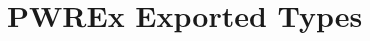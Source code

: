 \hypertarget{group___p_w_r_ex___exported___types}{}\section{P\+W\+R\+Ex Exported Types}
\label{group___p_w_r_ex___exported___types}
